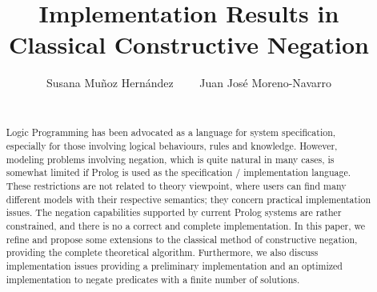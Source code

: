 \documentclass{llncs}
\begin{document}

\title{Implementation Results in \\
       Classical Constructive Negation}

\author{Susana Mu\~{n}oz Hern\'{a}ndez~~~~ Juan Jos\'{e} Moreno-Navarro \\
 ~~~~ }


\maketitle


%



\begin{abstract}
  Logic Programming has been advocated as a language for system
  specification, especially for those involving logical behaviours,
  rules and knowledge. However, modeling problems involving negation,
  which is quite natural in many cases, is somewhat limited if Prolog
  is used as the specification / implementation language. These
  restrictions are not related to theory viewpoint, where users can
  find many different models with their respective semantics; they
  concern practical implementation issues.  The negation capabilities
  supported by current Prolog systems are rather constrained, and
  there is no a correct and complete implementation.  In this paper,
  we refine and propose some extensions to the classical method of
  constructive negation, providing the complete theoretical
  algorithm. Furthermore, we also discuss implementation issues
  providing a preliminary implementation and an optimized
  implementation to negate predicates with a finite number of
  solutions.
\end{abstract}
\end{document}
